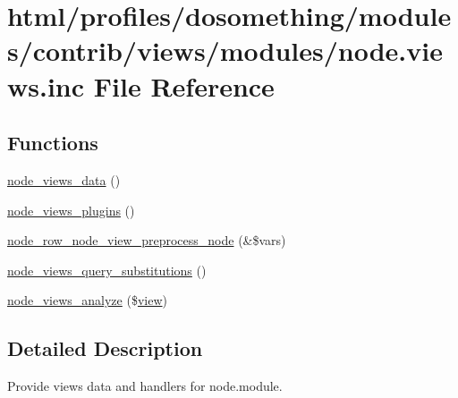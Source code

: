 \hypertarget{node_8views_8inc}{
\section{html/profiles/dosomething/modules/contrib/views/modules/node.views.inc File Reference}
\label{node_8views_8inc}
}
\subsection*{Functions}
\begin{DoxyCompactItemize}
\item 
\hyperlink{node_8views_8inc_a5e6beb23be547a792dba68f1066d4b9d}{node\_\-views\_\-data} ()
\item 
\hyperlink{node_8views_8inc_abad6697258bb04f10bbb73608ab1f52c}{node\_\-views\_\-plugins} ()
\item 
\hyperlink{node_8views_8inc_ac9a8871975d77054c1ba15c283398493}{node\_\-row\_\-node\_\-view\_\-preprocess\_\-node} (\&\$vars)
\item 
\hyperlink{node_8views_8inc_a207da742d80ba74315d7084eeed285b9}{node\_\-views\_\-query\_\-substitutions} ()
\item 
\hyperlink{node_8views_8inc_a6060098a01aedf1a74dba4720f806654}{node\_\-views\_\-analyze} (\$\hyperlink{classview}{view})
\end{DoxyCompactItemize}


\subsection{Detailed Description}
Provide views data and handlers for node.module. 

